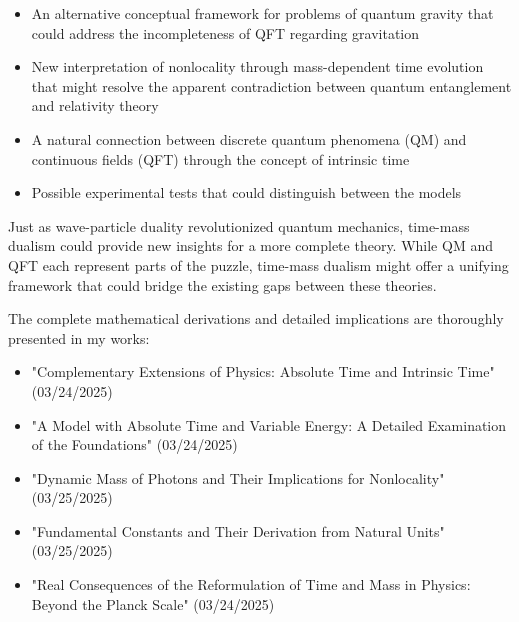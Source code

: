 \documentclass[a4paper,12pt]{article}
\begin{document}
	\begin{itemize}
		\item An alternative conceptual framework for problems of quantum gravity that could address the incompleteness of QFT regarding gravitation
		\item New interpretation of nonlocality through mass-dependent time evolution that might resolve the apparent contradiction between quantum entanglement and relativity theory
		\item A natural connection between discrete quantum phenomena (QM) and continuous fields (QFT) through the concept of intrinsic time
		\item Possible experimental tests that could distinguish between the models
	\end{itemize}
	
	Just as wave-particle duality revolutionized quantum mechanics, time-mass dualism could provide new insights for a more complete theory. While QM and QFT each represent parts of the puzzle, time-mass dualism might offer a unifying framework that could bridge the existing gaps between these theories.
	
	The complete mathematical derivations and detailed implications are thoroughly presented in my works:
	\begin{itemize}
		\item "Complementary Extensions of Physics: Absolute Time and Intrinsic Time" (03/24/2025)
		\item "A Model with Absolute Time and Variable Energy: A Detailed Examination of the Foundations" (03/24/2025)
		\item "Dynamic Mass of Photons and Their Implications for Nonlocality" (03/25/2025)
		\item "Fundamental Constants and Their Derivation from Natural Units" (03/25/2025)
		\item "Real Consequences of the Reformulation of Time and Mass in Physics: Beyond the Planck Scale" (03/24/2025)
	\end{itemize}
	
\end{document}
